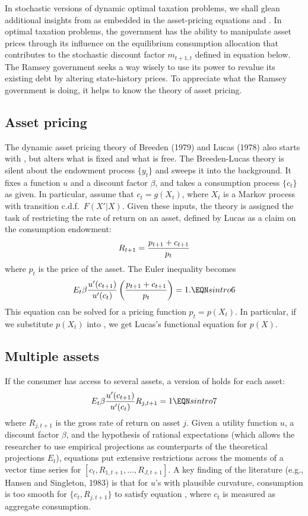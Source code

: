   In stochastic versions of dynamic optimal taxation problems, we shall glean
additional insights  from
 as embedded  in the asset-pricing
equations  and .
  In optimal taxation problems,
the government has the ability to manipulate asset prices through its
influence on the equilibrium consumption  allocation that
contributes to  the stochastic discount factor  $m_{t+1,t}$ defined in equation  below.
The Ramsey government seeks a way wisely
to use its power to
revalue its existing debt by altering state-history
prices. To appreciate what the Ramsey government is doing, it helps to know
the theory of asset pricing.


 

\subsection{Asset pricing}
 The dynamic asset  pricing theory of Breeden (1979)  and Lucas (1978)
also starts with , but alters what is fixed and what is
free.  The Breeden-Lucas
 theory is silent about the endowment process $\{y_{t}\}$ and sweeps
it into the background. It
fixes a function $u$ and a discount factor $\beta$,
and takes a consumption process $\{c_t\}$ as given.  In particular,
assume that $c_t = g(X_t)$, where $X_t$ is a Markov process with
transition c.d.f.\ $F(X'|X)$.  Given these inputs, the theory is assigned the task of
restricting the rate
of return on an asset, defined by Lucas as a
claim on the consumption endowment:
$$ R_{t+1} = {p_{t+1}    + c_{t+1} \over p_t}$$
where $p_t$ is the price of the asset.  The Euler inequality
 becomes
$$ E_t \beta {u'(c_{t+1}) \over u'(c_t)}\left({p_{t+1} + c_{t+1}
     \over p_t}\right)  =1. \EQN sintro6 $$
This equation can be solved for a pricing function
$p_t =p(X_t)$. In particular, if we substitute $p(X_t)$ into
, we get Lucas's functional equation for
$p(X)$.

\subsection{Multiple assets}

If the consumer has access to several assets,
 a version of  holds for each
asset:
$$ E_t \beta {u'(c_{t+1}) \over u'(c_t)} R_{j,t+1} =1  \EQN sintro7 $$
where $R_{j,t+1}$ is the gross rate of return on asset $j$.
Given a utility function $u$, a discount factor $\beta$,
and the hypothesis of rational expectations (which allows the researcher
to use empirical projections as counterparts of the  theoretical projections
$E_t$),
equations  put extensive restrictions across the moments
of a vector time series for $[c_t, R_{1,t+1}, \ldots, R_{J,t+1}]$.
 A key finding of the literature (e.g., Hansen and Singleton, 1983)
 is that for $u$'s with plausible
curvature,
consumption is too smooth for $\{c_t, R_{j,t+1}\}$ to satisfy
equation , where $c_t$ is measured as aggregate
consumption.

